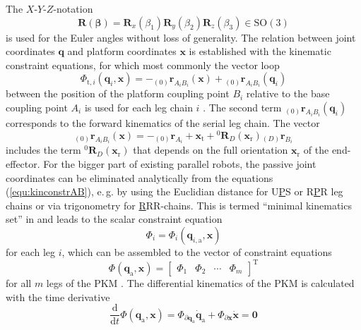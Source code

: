 \documentclass[robotics,article,submit,moreauthors,pdftex]{Definitions/mdpi}
\newcommand{\bm}[1]{\boldsymbol{#1}}
\newcommand{\ortvek}[4]{{ }_{(#1)}{\boldsymbol{#2}}^{#3}_{#4} }
\newcommand{\rotmat}[2]{{{ }^{#1}\boldsymbol{R}}_{#2}}
\newcommand{\transp}[0]{{\mathrm{T}}}
\let\Phi\varPhi
\begin{document}
The $X$-$Y$-$Z$-notation
%
\begin{equation}
\bm{R}(\bm{\beta}) = \bm{R}_x(\beta_1) \bm{R}_y(\beta_2) \bm{R}_z(\beta_3) \in \mathrm{SO(3)}
\label{equ:def_rmat_xyz}
\end{equation}
%
is used for the Euler angles without loss of generality.
%
The relation between joint coordinates $\bm{q}$ and platform coordinates $\bm{x}$ is established with the kinematic constraint equations, for which most commonly the vector loop
%
\begin{equation}
\bm{\Phi}_{\mathrm{t},i}(\bm{q}_i,\bm{x}) = - \ortvek{0}{r}{}{A_iB_i}(\bm{x}) + \ortvek{0}{r}{}{A_iB_i}(\bm{q}_i) 
\label{equ:kinconstrAB}
\end{equation}
%
between the position of the platform coupling point $B_i$ relative to the base coupling point $A_i$ is used for each leg chain $i$ \cite{Merlet2006}.
The second term $\ortvek{0}{r}{}{A_iB_i}(\bm{q}_i)$ corresponds to the forward kinematics of the serial leg chain. 
The vector
\begin{equation}
\ortvek{0}{r}{}{A_iB_i}(\bm{x}) = 
- \ortvek{0}{r}{}{A_i}
+ \bm{x}_{\mathrm{t}} + \rotmat{0}{D}(\bm{x}_{\mathrm{r}}) \ortvek{D}{r}{}{B_i}
\label{equ:vec_AB}
\end{equation}
%
includes the term $\rotmat{0}{D}(\bm{x}_{\mathrm{r}})$ that depends on the full  orientation $\bm{x}_{\mathrm{r}}$ of the end-effector.
%
For the bigger part of existing parallel robots, the passive joint coordinates can be eliminated analytically from the equations (\ref{equ:kinconstrAB}), e.\,g. by using the Euclidian distance for U\underline{P}S or R\underline{P}R leg chains or via trigonometry for \underline{R}RR-chains.
This is termed ``minimal kinematics set'' in \cite{Merlet2006} and leads to the scalar constraint equation
%
\begin{equation}
\Phi_{i}
=
\Phi_{i}(\bm{q}_{i,\mathrm{a}},\bm{x})
\end{equation}
%
for each leg $i$, which can be assembled to the vector of constraint equations
%
\begin{equation}
\bm{\Phi}(\bm{q}_{\mathrm{a}},\bm{x})
=
\begin{bmatrix}
\Phi_1 & \Phi_2 & \cdots & \Phi_m
\end{bmatrix}^\transp
\label{equ:constr_qa}
\end{equation}
%
for all $m$ legs of the PKM .
The differential kinematics of the PKM is calculated with the time derivative
%
\begin{equation}
\frac{\mathrm{d}}{{\mathrm{d}}t} \bm{\Phi}(\bm{q}_\mathrm{a},\bm{x})
=
\bm{\Phi}_{\partial \bm{q}_\mathrm{a}}  \dot{\bm{q}}_\mathrm{a}
+
\bm{\Phi}_{\partial \bm{x}} \dot{\bm{x}}
=
\bm{0}
\label{equ:constr_qa_diff}
\end{equation}
\end{document}
